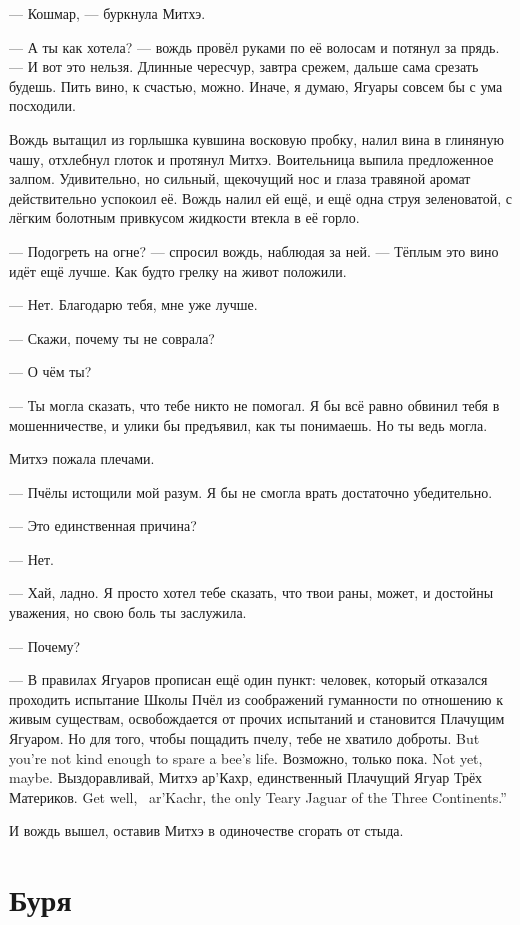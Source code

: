 --- Кошмар, --- буркнула Митхэ.

--- А ты как хотела? --- вождь провёл руками по её волосам и потянул за прядь.
--- И вот это нельзя.
Длинные чересчур, завтра срежем, дальше сама срезать будешь.
Пить вино, к счастью, можно.
Иначе, я думаю, Ягуары совсем бы с ума посходили.

Вождь вытащил из горлышка кувшина восковую пробку, налил вина в глиняную чашу, отхлебнул глоток и протянул Митхэ.
Воительница выпила предложенное залпом.
Удивительно, но сильный, щекочущий нос и глаза травяной аромат действительно успокоил её.
Вождь налил ей ещё, и ещё одна струя зеленоватой, с лёгким болотным привкусом жидкости втекла в её горло.

--- Подогреть на огне? --- спросил вождь, наблюдая за ней.
--- Тёплым это вино идёт ещё лучше.
Как будто грелку на живот положили.

--- Нет.
Благодарю тебя, мне уже лучше.

--- Скажи, почему ты не соврала?

--- О чём ты?

--- Ты могла сказать, что тебе никто не помогал.
Я бы всё равно обвинил тебя в мошенничестве, и улики бы предъявил, как ты понимаешь.
Но ты ведь могла.

Митхэ пожала плечами.

--- Пчёлы истощили мой разум.
Я бы не смогла врать достаточно убедительно.

--- Это единственная причина?

--- Нет.

--- Хай, ладно.
Я просто хотел тебе сказать, что твои раны, может, и достойны уважения, но свою боль ты заслужила.

--- Почему?

--- В правилах Ягуаров прописан ещё один пункт: человек, который отказался проходить испытание Школы Пчёл из соображений гуманности по отношению к живым существам, освобождается от прочих испытаний и становится Плачущим Ягуаром.
{Но для того, чтобы пощадить пчелу, тебе не хватило доброты.}
{But you're not kind enough to spare a bee's life.}
{Возможно, только пока.}
{Not yet, maybe.}
{Выздоравливай, Митхэ ар'Кахр, единственный Плачущий Ягуар Трёх Материков.}
{Get well, \Mitchoe\ ar'Kachr, the only Teary Jaguar of the Three Continents.''}

И вождь вышел, оставив Митхэ в одиночестве сгорать от стыда.

\chapter{Буря}

